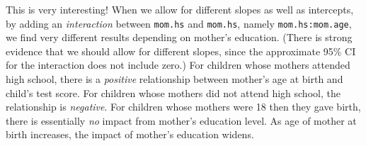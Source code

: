 \documentclass[addpoints,12pt]{exam}\usepackage[]{graphicx}\usepackage[]{color}
\newenvironment{knitrout}{}{} %
\begin{document}
\begin{questions}
\begin{parts}
\begin{solution}
\begin{knitrout}
\end{knitrout}
This is very interesting! When we allow for different slopes as well as intercepts, by adding an \emph{interaction} between \texttt{mom.hs} and \texttt{mom.hs}, namely \texttt{mom.hs:mom.age}, we find very different results depending on mother's education. (There is strong evidence that we should allow for different slopes, since the approximate 95\% CI for the interaction does not include zero.)  For children whose mothers attended high school, there is a \emph{positive} relationship between mother's age at birth and child's test score. For children whose mothers did not attend high school, the relationship is \emph{negative}. For children whose mothers were 18 then they gave birth, there is essentially \emph{no} impact from mother's education level. As age of mother at birth increases, the impact of mother's education widens. 
\end{solution}
	\end{parts}

\end{questions}
\end{document}
